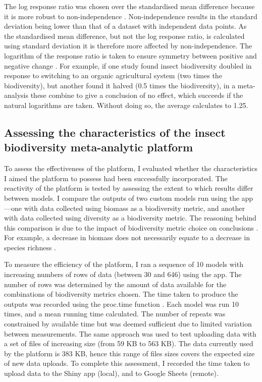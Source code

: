 \documentclass[11pt]{article}
\begin{document}
			\noindent The log response ratio was chosen over the standardised mean difference because it is more robust to non-independence \parencite{noble2017nonindependence}. Non-independence results in the standard deviation being lower than that of a dataset with independent data points. As the standardised mean difference, but not the log response ratio, is calculated using standard deviation it is therefore more affected by non-independence. The logarithm of the response ratio is taken to ensure symmetry between positive and negative change \parencite{hedges1999meta}. For example, if one study found insect biodiversity doubled in response to switching to an organic agricultural system (two times the biodiversity), but another found it halved (0.5 times the biodiversity), in a meta-analysis these combine to give a conclusion of no effect, which succeeds if the natural logarithms are taken. Without doing so, the average calculates to 1.25. 
		
		\subsection{Assessing the characteristics of the insect biodiversity meta-analytic platform }
			To assess the effectiveness of the platform, I evaluated whether the characteristics I aimed the platform to possess had been successfully incorporated. The reactivity of the platform is tested by assessing the extent to which results differ between models. I compare the outputs of two custom models run using the app—one with data collected using biomass as a biodiversity metric, and another with data collected using diversity as a biodiversity metric. The reasoning behind this comparison is due to the impact of biodiversity metric choice on conclusions \parencite{hillebrand2018biodiversity}. For example, a decrease in biomass does not necessarily equate to a decrease in species richness \parencite{jahnig2021revisiting}. 
		
			\noindent To measure the efficiency of the platform, I ran a sequence of 10 models with increasing numbers of rows of data (between 30 and 646) using the app. The number of rows was determined by the amount of data available for the combinations of biodiversity metrics chosen. The time taken to produce the outputs was recorded using the proc.time function \parencite{team2013r}. Each model was run 10 times, and a mean running time calculated. The number of repeats was constrained by available time but was deemed sufficient due to limited variation between measurements. The same approach was used to test uploading data with a set of files of increasing size (from 59 KB to 563 KB). The data currently used by the platform is 383 KB, hence this range of files sizes covers the expected size of new data uploads. To complete this assessment, I recorded the time taken to upload data to the Shiny app (local), and to Google Sheets (remote). 
		
\end{document}
